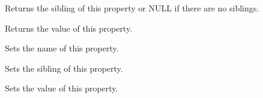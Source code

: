 
Returns the sibling of this property or NULL if there are no siblings.

\label{wxxmlpropertygetvalue}


Returns the value of this property.

\label{wxxmlpropertysetname}


Sets the name of this property.

\label{wxxmlpropertysetnext}


Sets the sibling of this property.

\label{wxxmlpropertysetvalue}


Sets the value of this property.

